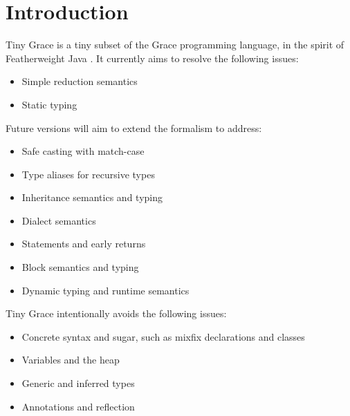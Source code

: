 \section{Introduction}

Tiny Grace is a tiny subset of the Grace programming language, in the spirit of
Featherweight Java \cite{fj}.  It currently aims to resolve the following
issues:

\begin{itemize}

\item Simple reduction semantics

\item Static typing

\end{itemize}

\noindent Future versions will aim to extend the formalism to address:

\begin{itemize}

\item Safe casting with match-case

\item Type aliases for recursive types

\item Inheritance semantics and typing

\item Dialect semantics

\item Statements and early returns

\item Block semantics and typing

\item Dynamic typing and runtime semantics

\end{itemize}

\noindent Tiny Grace intentionally avoids the following issues:

\begin{itemize}

\item Concrete syntax and sugar, such as mixfix declarations and classes

\item Variables and the heap

\item Generic and inferred types

\item Annotations and reflection

\end{itemize}

